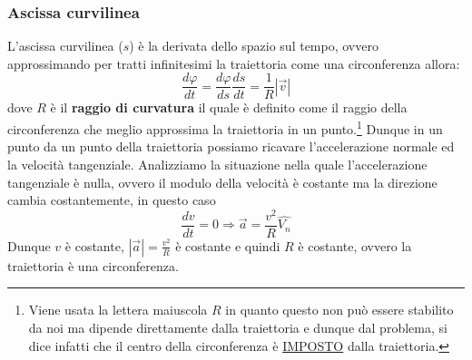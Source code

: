         \subsubsection{Ascissa curvilinea}
            L'ascissa curvilinea ($s$) è la derivata dello spazio sul tempo, ovvero approssimando per tratti infinitesimi la traiettoria come una circonferenza allora:
            $$
                \frac{d\varphi}{dt}= \frac{d\varphi}{ds}\frac{ds}{dt} = \frac{1}{R}\left|\vec{v}\right|
            $$
            dove $R$ è il \textbf{raggio di curvatura} il quale è definito come il raggio della circonferenza che meglio approssima la traiettoria in un punto.\footnote{Viene usata la lettera maiuscola $R$ in quanto questo non può essere stabilito da noi ma dipende direttamente dalla traiettoria e dunque dal problema, si dice infatti che il centro della circonferenza è \underline{IMPOSTO} dalla traiettoria.}
            Dunque in un punto da un punto della traiettoria possiamo ricavare l'accelerazione normale ed la velocità tangenziale.\newline
            Analizziamo la situazione nella quale l'accelerazione tangenziale è nulla, ovvero il modulo della velocità è costante ma la direzione cambia costantemente, in questo caso $$
            \frac{dv}{dt} = 0 \Rightarrow \vec{a} = \frac{v^2}{R}\hat{V_n}
            $$
            Dunque $v$ è costante, $|\vec{a}| = \frac{v^2}{R}$ è costante e quindi $R$ è costante, ovvero la traiettoria è una circonferenza.

